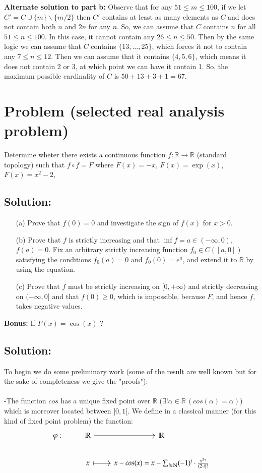 \documentclass[11pt, a4paper, oneside]{article}
\newcommand{\problem}[1][]{\section{#1} \hfill \par}
\newcommand{\solution}[1][]{\subsection*{#1}\hfill \par}
\theoremstyle{remark}
\theoremstyle{lemma}
\begin{document}
\textbf{Alternate solution to part b:} Observe that for any \( 51 \leq m \leq 100 \), if we let \( C' = C \cup \{m\} \backslash \{m/2\} \) then \( C' \) contains at least as many elements as \( C \) and does not contain both \( n \) and \( 2n \) for any \( n \). So, we can assume that \( C \) contains \( n \) for all \( 51 \leq n \leq 100 \). In this case, it cannot contain any \( 26 \leq n \leq 50 \). Then by the same logic we can assume that \( C \) contains \(\{13, \ldots, 25\}\), which forces it not to contain any \( 7 \leq n \leq 12 \). Then we can assume that it contains \(\{4, 5, 6\}\), which means it does not contain 2 or 3, at which point we can have it contain 1. So, the maximum possible cardinality of \( C \) is \( 50 + 13 + 3 + 1 = \boxed{67} \).

\newpage
\problem[Problem (selected real analysis problem)]
Determine wheter there exists a continuous function $f:\mathbb{R}\rightarrow\mathbb{R}$ (standard topology) such that $f\circ f=F$
where $F(x)=-x$, $F(x)=\exp(x)$, $F(x)=x^2-2$,
\solution[Solution:]
\begin{itemize}
    \item[(a)] Prove that \( f(0) = 0 \) and investigate the sign of \( f(x) \) for \( x > 0 \).
    \item[(b)] Prove that \( f \) is strictly increasing and that \( \inf f = a \in (-\infty, 0) \), \( f(a) = 0 \). Fix an arbitrary strictly increasing function \( f_0 \in C([a,0]) \) satisfying the conditions \( f_0(a) = 0 \) and \( f_0(0) = e^a \), and extend it to \( \mathbb{R} \) by using the equation.
    \item[(c)] Prove that \( f \) must be strictly increasing on \( [0, +\infty) \) and strictly decreasing on \( (-\infty, 0] \) and that \( f(0) \geq 0 \), which is impossible, because \( F \), and hence \( f \), takes negative values.
\end{itemize}
\textbf{Bonus:} If $F(x)=\cos(x)$ ?
\solution[Solution:]
To begin we do some preliminary work (some of the result are well known but for the sake of completeness we give the "proofs"):
\\\\
-The function $cos$ has a unique fixed point over $\mathbb{R}$ ($\exists!\alpha\in\mathbb{R}\,(cos(\alpha)=\alpha)$) which is moreover located between $]0,1[$. We define in a classical manner (for this kind of fixed point problem) the function:
\[\begin{tikzcd}
	{\varphi:} & {\mathbb{R}} & {\mathbb{R}} \\
	& x & {x-cos(x)=x-\sum_{i\in\mathbb{N}}(-1)^{i}\cdot\frac{x^{2\cdot i}}{(2\cdot i)!}}
	\arrow[from=1-2, to=1-3]
	\arrow[maps to, from=2-2, to=2-3]
\end{tikzcd}\]
\end{document}
